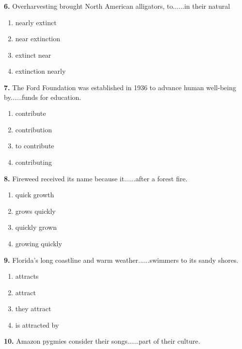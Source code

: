 \documentclass[12pt]{article}
\begin{document}
\par
\vspace{0.25\baselineskip}
\noindent\textbf{6.} Overharvesting brought North American alligators, to......in their natural
\begin{enumerate}[label=(\Alph*),leftmargin=*,itemsep=0.2em]
\item nearly extinct
\item near extinction
\item extinct near
\item extinction nearly
\end{enumerate}
\par
\vspace{0.25\baselineskip}
\noindent\textbf{7.} The Ford Foundation was established in 1936 to advance human well-being by......funds for education.
\begin{enumerate}[label=(\Alph*),leftmargin=*,itemsep=0.2em]
\item contribute
\item contribution
\item to contribute
\item contributing
\end{enumerate}
\par
\vspace{0.25\baselineskip}
\noindent\textbf{8.} Fireweed received its name because it......after a forest fire.
\begin{enumerate}[label=(\Alph*),leftmargin=*,itemsep=0.2em]
\item quick growth
\item grows quickly
\item quickly grown
\item growing quickly
\end{enumerate}
\par
\vspace{0.25\baselineskip}
\noindent\textbf{9.} Florida's long coastline and warm weather......swimmers to its sandy shores.
\begin{enumerate}[label=(\Alph*),leftmargin=*,itemsep=0.2em]
\item attracts
\item attract
\item they attract
\item is attracted by
\end{enumerate}
\par
\vspace{0.25\baselineskip}
\noindent\textbf{10.} Amazon pygmies consider their songs......part of their culture.
\end{document}
